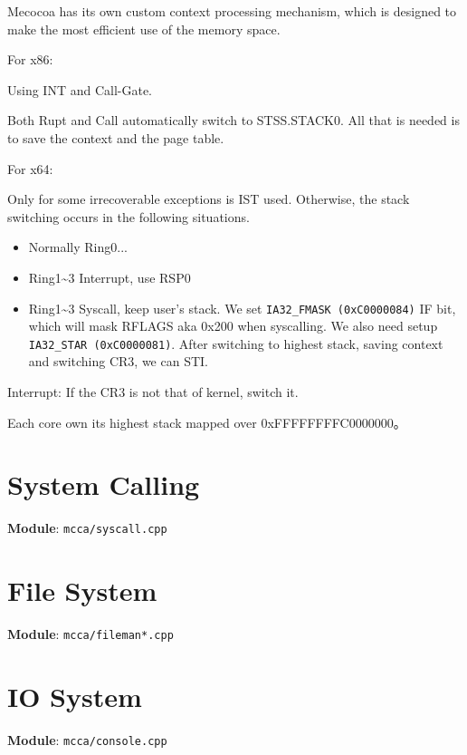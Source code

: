 Mecocoa has its own custom context processing mechanism, which is designed to make the most efficient use of the memory space.

For x86:

Using INT and Call-Gate.

Both Rupt and Call automatically switch to STSS.STACK0. All that is needed is to save the context and the page table.

For x64:

Only for some irrecoverable exceptions is IST used. Otherwise, the stack switching occurs in the following situations.

\begin{itemize}

\item Normally Ring0...
\item Ring1\textasciitilde{}3 Interrupt, use RSP0
\item Ring1\textasciitilde{}3 Syscall, keep user's stack. We set \verb|IA32_FMASK (0xC0000084)| IF bit, which will mask RFLAGS aka 0x200 when syscalling. We also need setup \verb|IA32_STAR (0xC0000081)|. After switching to highest stack, saving context and switching CR3, we can STI.
\end{itemize}

Interrupt: If the CR3 is not that of kernel, switch it.

Each core own its highest stack mapped over 0xFFFFFFFFC0000000。



\chapter{System Calling}

\textbf{Module}: \verb|mcca/syscall.cpp|



\chapter{File System}

\textbf{Module}: \verb|mcca/fileman*.cpp|



\chapter{IO System}

\textbf{Module}: \verb|mcca/console.cpp|

